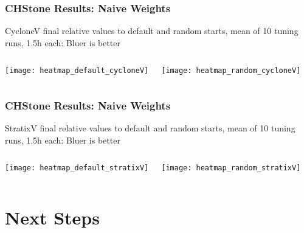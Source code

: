 \documentclass[10pt, compress, aspectratio=169, xcolor=table]{beamer}
\begin{document}
\begin{frame}
    \frametitle{CHStone Results: Naive Weights}
    \alert{CycloneV} final relative values to \alert{default} and
    \alert{random} starts, mean of \alert{10 tuning runs}, \alert{1.5h each}:
    \alert{Bluer} is \alert{better}
    \begin{columns}[T,onlytextwidth]
        \begin{center}
            \texttt{[image: heatmap\_default\_cycloneV]}
        \end{center}

        \begin{center}
            \texttt{[image: heatmap\_random\_cycloneV]}
        \end{center}

    \end{columns}
\end{frame}

\begin{frame}
    \frametitle{CHStone Results: Naive Weights}
    \alert{StratixV} final relative values to \alert{default} and
    \alert{random} starts, mean of \alert{10 tuning runs}, \alert{1.5h each}:
    \alert{Bluer} is \alert{better}

    \begin{columns}[T,onlytextwidth]
        \begin{center}
            \texttt{[image: heatmap\_default\_stratixV]}
        \end{center}

        \begin{center}
            \texttt{[image: heatmap\_random\_stratixV]}
        \end{center}

    \end{columns}
\end{frame}

\section{Next Steps}
\end{document}
